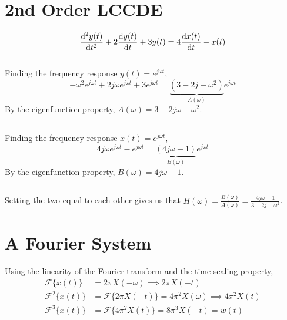 \documentclass{article}
\newcommand{\F}{\mathcal{F}}
\begin{document}
\section{2nd Order LCCDE}

\begin{equation}
    \dv[2]{y(t)}{t} + 2\dv{y(t)}{t} + 3 y(t) = 4\dv{x(t)}{t} - x(t)
\end{equation}

\subsection{}

Finding the frequency response \(y(t) = e^{j \omega t}\),
\begin{equation}
    -\omega^2 e^{j \omega t} + 2j \omega e^{j \omega t} + 3 e^{j \omega t} = \underbrace{(3 - 2j - \omega^2)}_{A(\omega)} e^{j \omega t}
\end{equation}
By the eigenfunction property, \(A(\omega) = 3 - 2j \omega - \omega^2\).

\subsection{}

Finding the frequency response \(x(t) = e^{j \omega t}\),
\begin{equation}
    4j \omega e^{j \omega t} - e^{j \omega t} = \underbrace{(4j \omega - 1)}_{B(\omega)} e^{j \omega t}
\end{equation}
By the eigenfunction property, \(B(\omega) = 4j \omega - 1\).

\subsection{}

Setting the two equal to each other gives us that \(H(\omega) = \frac{B(\omega)}{A(\omega)} = \frac{4j \omega - 1}{3 - 2j - \omega^2}\).

\section{A Fourier System}

Using the linearity of the Fourier transform and the time scaling property,
\begin{align}
    \F\{x(t)\} &= 2\pi X(-\omega) \implies 2\pi X(-t)\\
    \F^2\{x(t)\} &= \F\{2\pi X(-t)\} = 4\pi^2 X(\omega) \implies 4\pi^2 X(t) \\
    \F^3\{x(t)\} &= \F\{4\pi^2 X(t)\} = 8\pi^3 X(-t) = w(t)
\end{align}
\end{document}
